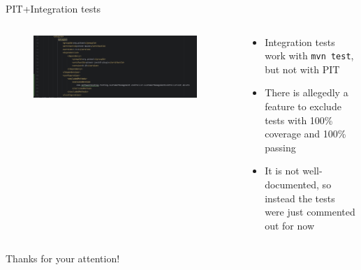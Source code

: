 \documentclass[compress,aspectratio=169]{beamer}
\begin{document}
 	\begin{frame}{PIT+Integration tests}
    \begin{columns}
      \begin{column}{0.5\textwidth}
        \begin{figure}
          \begin{center}
            \includegraphics[width=0.95\textwidth]{excludedmethod.png}
          \end{center}
        \end{figure}
      \end{column}
      \begin{column}{0.5\textwidth}
        \begin{itemize}
                \item Integration tests work with \texttt{mvn test}, but not with PIT
                \item There is allegedly a feature to exclude tests with 100\% coverage and 100\% passing
                \item It is not well-documented, so instead the tests were just commented out for now
        \end{itemize}
      \end{column}
    \end{columns}
	\end{frame}

	\begin{frame}{}
		\label{pg:lastpage} %
    \begin{center}
    \Huge Thanks for your attention!
    \end{center}
	\end{frame}
\end{document}
